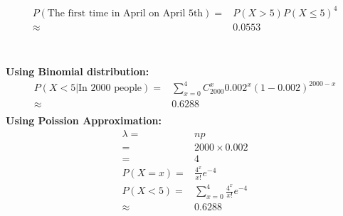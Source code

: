 \documentclass{article}
\begin{document}
        \subsection{}
        \paragraph{
            \begin{equation*}
                \begin{split}
                    P(\text{The first time in April on April 5th})=&P(X>5) P(X\leq 5)^4\\
                        \approx&0.0553\\
                \end{split}
            \end{equation*}
        }
    \section{}
        \subsection{}
            \paragraph{
                Using Binomial distribution:
                \begin{equation*}
                    \begin{split}
                        P(X<5|\text{In 2000 people})=&\sum_{x=0}^4C_{2000}^x 0.002^x(1-0.002)^{2000-x}\\
                            \approx&0.6288\\
                    \end{split}
                \end{equation*}
                Using Poission Approximation:
                \begin{equation*}
                    \begin{split}
                        \lambda=&np\\
                            =&2000\times 0.002\\
                            =&4\\
                        P(X=x)=&\frac{4^x}{x!}e^{-4}\\
                        P(X<5)=&\sum_{x=0}^4\frac{4^x}{x!}e^{-4}\\
                            \approx&0.6288\\
                    \end{split}
                \end{equation*}
            }
\end{document}
